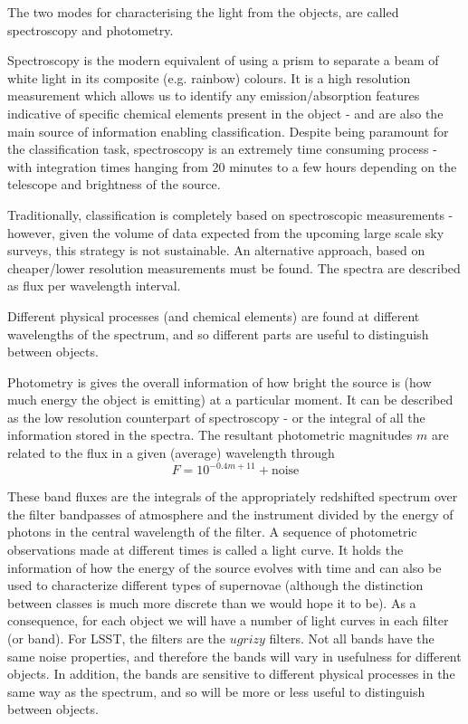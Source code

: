 \documentclass[\docopts]{\docclass}
\begin{document}
The two modes for characterising the light from the objects, are called spectroscopy and photometry.

Spectroscopy is the modern equivalent of using a prism to separate a beam of white light in its composite (e.g. rainbow) colours. It is a high resolution measurement which allows us to identify any emission/absorption features indicative of specific chemical elements present in the object - and are also the main source of information enabling classification. Despite being paramount for the classification task, spectroscopy is an extremely time consuming process - with integration times hanging from 20 minutes to a few hours depending on the telescope and brightness of the source.

Traditionally, classification is completely based on spectroscopic measurements - however, given the volume of data expected from the upcoming large scale sky surveys, this strategy is not sustainable. An alternative approach, based on cheaper/lower resolution measurements must be found. The spectra are described as flux per wavelength interval. 

Different physical processes (and chemical elements) are found at different wavelengths of the spectrum, and so different parts are useful to distinguish between objects.

Photometry is gives the overall information of how bright the source is (how much energy the object is emitting) at a particular moment. It can be described as the low resolution counterpart of spectroscopy - or the integral of all the information stored in the spectra. The resultant photometric magnitudes $m$ are related to the flux in a given (average) wavelength through 
\begin{equation}
F = 10^{-0.4m+11} + \mbox{noise}
\end{equation}

These band fluxes are the integrals of the appropriately redshifted spectrum over the filter bandpasses of atmosphere and the instrument divided by the energy of photons in the central wavelength of the filter. A sequence of photometric observations made at different times is called a light curve. It holds the information of how the energy of the source evolves with time and can also be used to characterize different types of supernovae (although the distinction between classes is much more discrete than we would hope it to be). As a consequence, for each object we will have a number of light curves in each filter (or band). For LSST, the filters are the $ugrizy$ filters. Not all bands have the same noise properties, and therefore the bands will vary in usefulness for different objects. In addition, the bands are sensitive to different physical processes in the same way as the spectrum, and so will be more or less useful to distinguish between objects.
\end{document}
